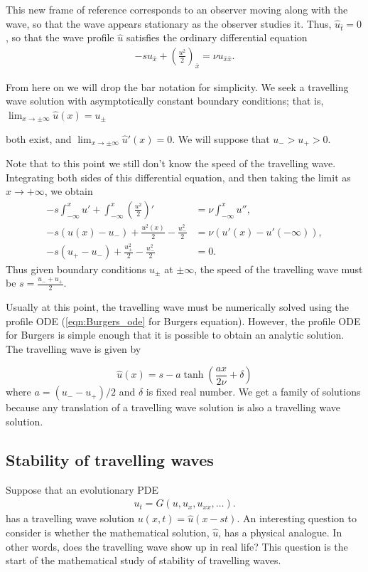 This new frame of reference corresponds to an observer moving along with the wave, so that the wave appears stationary as the observer studies it.
Thus, $\hat{u}_{\bar{t}} = 0$, so that the wave profile $\hat{u}$ satisfies the ordinary differential equation
\begin{align}
	 -s u_{\bar{x}}+ \left(\frac{u^2}{2} \right)_{\bar{x}} = \nu u_{\bar{x}\bar{x}}.
	\label{eqn:Burgers_ode}
\end{align}

From here on we will drop the bar notation for simplicity.
We seek a travelling wave solution with asymptotically constant boundary conditions; that is,  $\lim_{x \to \pm \infty}\hat{u}(x) = u_{\pm}$

both exist, and  $\lim_{x \to \pm \infty} \hat{u}'(x) = 0$.
We will suppose that $u_- > u_+ > 0$.

Note that to this point we still don't know the speed of the travelling wave.
Integrating both sides of this differential equation, and then taking the limit as $x \to +\infty$, we obtain
\begin{align*}
-s\int_{-\infty}^x u' + \int_{-\infty}^x \left(\frac{u^2}{2}\right)' &= \nu \int_{-\infty}^x u'',\\
-s(u(x) - u_-) + \frac{u^2(x)}{2} - \frac{u_-^2}{2} &= \nu (u'(x) - u'(-\infty)), \\
-s(u_+ - u_-) + \frac{u_+^2}{2} - \frac{u_-^2}{2} &= 0.
\end{align*}
Thus given boundary conditions $u_{\pm}$ at $\pm \infty$, the speed of the travelling wave must be $s = \frac{u_- + u_+}{2}$.

Usually at this point, the travelling wave must be numerically solved using the profile ODE (\eqref{eqn:Burgers_ode} for Burgers equation).
However, the profile ODE for Burgers is simple enough that it is possible to obtain an analytic solution.
The travelling wave is  given by

\[\hat{u}(x) = s - a \tanh \left(\frac{ax }{2\nu} + \delta\right)\]
where $a = (u_- - u_+)/2$ and $\delta$ is fixed real number.
We get a family of solutions because any translation of a travelling wave solution is also a travelling wave solution.

\subsection*{Stability of travelling waves}
Suppose that an evolutionary PDE
\begin{align}
u_t = G(u,u_x, u_{xx}, \ldots).
\label{eqn:evol_pde_repeat}
\end{align}
has a travelling wave solution $u(x,t) = \hat{u}(x-st)$.
An interesting question to consider is whether the mathematical solution, $\hat{u}$, has a physical analogue.
In other words, does the travelling wave show up in real life?
This question is the start of the mathematical study of stability of travelling waves.

